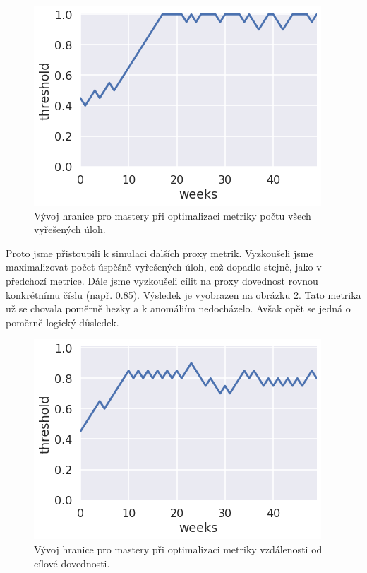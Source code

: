 \documentclass[twocolumn,10pt,cleanfoot]{asme2ej}
\begin{document}
\begin{figure}[htb]
\centering
\includegraphics[width=\columnwidth]{img/thresholds-solved-tasks}
\caption{Vývoj hranice pro mastery při optimalizaci metriky počtu všech vyřešených úloh.}
\label{fig:thresholds-solved-tasks}
\end{figure}


Proto jsme přistoupili k simulaci dalších proxy metrik. Vyzkoušeli jsme maximalizovat počet úspěšně vyřešených úloh, což dopadlo stejně, jako v předchozí metrice. Dále jsme vyzkoušeli cílit na proxy dovednost rovnou konkrétnímu číslu (např. 0.85). Výsledek je vyobrazen na obrázku \ref{fig:thresholds-target-skill}.
Tato metrika už se chovala poměrně hezky a k anomáliím nedocházelo. Avšak opět se jedná o poměrně logický důsledek.

\begin{figure}[htb]
\centering
\includegraphics[width=\columnwidth]{img/thresholds-target-skill}
\caption{Vývoj hranice pro mastery při optimalizaci metriky vzdálenosti od cílové dovednosti.}
\label{fig:thresholds-target-skill}
\end{figure}
\end{document}
